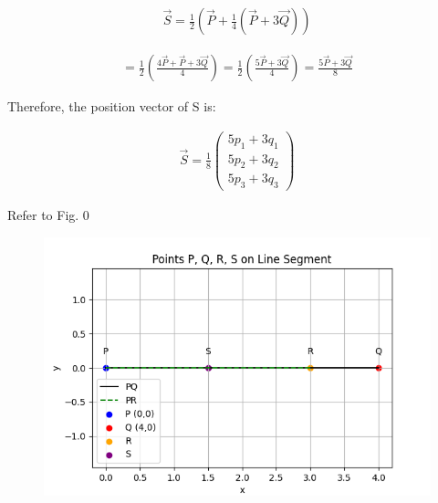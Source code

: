 \documentclass[journal]{IEEEtran}
\begin{document}
\begin{align}
\vec{S} = \frac{1}{2} \left( \vec{P} + \frac{1}{4}(\vec{P} + 3\vec{Q}) \right )
\end{align}

\begin{align}
= \frac{1}{2} \left( \frac{4\vec{P} + \vec{P} + 3\vec{Q}}{4} \right )
= \frac{1}{2} \left( \frac{5\vec{P} + 3\vec{Q}}{4} \right )
= \frac{5\vec{P} + 3\vec{Q}}{8}
\end{align}


Therefore, the position vector of S is:

\begin{align}
\boxed{
\vec{S} =
\frac{1}{8}
\begin{pmatrix}
5p_1 + 3q_1 \\
5p_2 + 3q_2 \\
5p_3 + 3q_3
\end{pmatrix}
}
\end{align}


Refer to Fig. 0

\begin{figure}[H]
\begin{center}
\includegraphics[width=0.75\columnwidth]{figs/graph.png}
\end{center}
\caption{}
\label{fig:Fig}
\end{figure}
\end{document}
